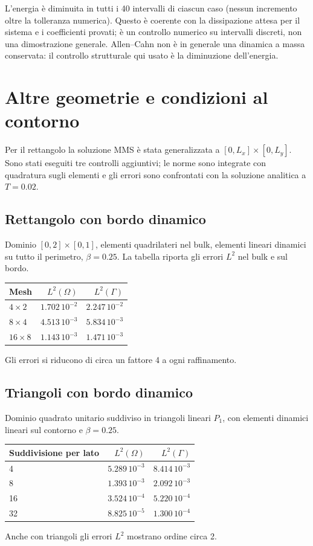 \documentclass[11pt,a4paper]{article}
\begin{document}
L'energia è diminuita in tutti i 40 intervalli di ciascun caso (nessun incremento oltre la tolleranza numerica). Questo è coerente con la dissipazione attesa per il sistema e i coefficienti provati; è un controllo numerico su intervalli discreti, non una dimostrazione generale. Allen--Cahn non è in generale una dinamica a massa conservata: il controllo strutturale qui usato è la diminuzione dell'energia.

\clearpage
\section{Altre geometrie e condizioni al contorno}
Per il rettangolo la soluzione MMS è stata generalizzata a $[0,L_x]\times[0,L_y]$. Sono stati eseguiti tre controlli aggiuntivi; le norme sono integrate con quadratura sugli elementi e gli errori sono confrontati con la soluzione analitica a $T=0.02$.

\subsection*{Rettangolo con bordo dinamico}
Dominio $[0,2]\times[0,1]$, elementi quadrilateri nel bulk, elementi lineari dinamici su tutto il perimetro, $\beta=0.25$. La tabella riporta gli errori $L^2$ nel bulk e sul bordo.
\begin{center}\small
\begin{tabular}{lrr}
\toprule
Mesh & $L^2(\Omega)$ & $L^2(\Gamma)$\\
\midrule
$4\times2$ & $1.702\,10^{-2}$ & $2.247\,10^{-2}$\\
$8\times4$ & $4.513\,10^{-3}$ & $5.834\,10^{-3}$\\
$16\times8$ & $1.143\,10^{-3}$ & $1.471\,10^{-3}$\\
\bottomrule
\end{tabular}
\end{center}
Gli errori si riducono di circa un fattore 4 a ogni raffinamento.

\subsection*{Triangoli con bordo dinamico}
Dominio quadrato unitario suddiviso in triangoli lineari $P_1$, con elementi dinamici lineari sul contorno e $\beta=0.25$.
\begin{center}\small
\begin{tabular}{lrr}
\toprule
Suddivisione per lato & $L^2(\Omega)$ & $L^2(\Gamma)$\\
\midrule
4 & $5.289\,10^{-3}$ & $8.414\,10^{-3}$\\
8 & $1.393\,10^{-3}$ & $2.092\,10^{-3}$\\
16 & $3.524\,10^{-4}$ & $5.220\,10^{-4}$\\
32 & $8.825\,10^{-5}$ & $1.300\,10^{-4}$\\
\bottomrule
\end{tabular}
\end{center}
Anche con triangoli gli errori $L^2$ mostrano ordine circa 2.
\end{document}

